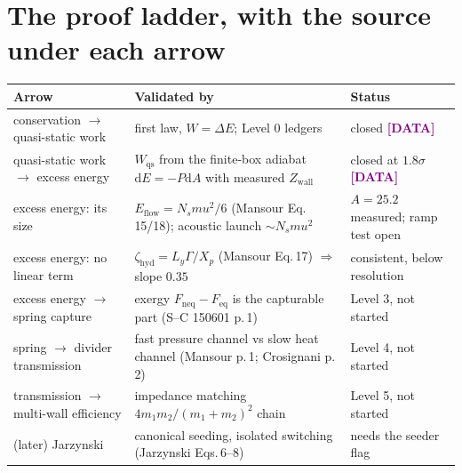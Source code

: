 \documentclass[11pt,a4paper]{article}
\newcommand{\dd}{\mathrm{d}}
\newcommand{\dat}{\textcolor{Purple}{\textbf{[DATA]}}}
\begin{document}
\section{The proof ladder, with the source under each arrow}
\begin{center}
\small
\begin{tabular}{@{}p{4.2cm}p{7.6cm}p{3.6cm}@{}}
\toprule
Arrow & Validated by & Status \\
\midrule
conservation $\to$ quasi-static work & first law, $W = \Delta E$; Level 0 ledgers & closed \dat{} \\
quasi-static work $\to$ excess energy & $W_{\mathrm{qs}}$ from the finite-box adiabat $\dd E = -P\dd A$ with measured $Z_{\mathrm{wall}}$ & closed at $1.8\sigma$ \dat{} \\
excess energy: its size & $E_{\mathrm{flow}} = N_s m u^2/6$ (Mansour Eq.\,15/18); acoustic launch $\sim N_s m u^2$ & $A = 25.2$ measured; ramp test open \\
excess energy: no linear term & $\zeta_{\mathrm{hyd}} = L_y\Gamma/X_p$ (Mansour Eq.\,17) $\Rightarrow$ slope $0.35$ & consistent, below resolution \\
excess energy $\to$ spring capture & exergy $F_{\mathrm{neq}} - F_{\mathrm{eq}}$ is the capturable part (S--C 150601 p.\,1) & Level 3, not started \\
spring $\to$ divider transmission & fast pressure channel vs slow heat channel (Mansour p.\,1; Crosignani p.\,2) & Level 4, not started \\
transmission $\to$ multi-wall efficiency & impedance matching $4m_1m_2/(m_1+m_2)^2$ chain & Level 5, not started \\
(later) Jarzynski & canonical seeding, isolated switching (Jarzynski Eqs.\,6--8) & needs the seeder flag \\
\bottomrule
\end{tabular}
\end{center}
\end{document}
